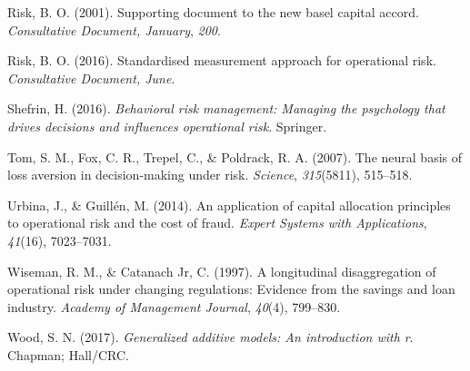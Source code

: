 \documentclass{DissertateUSU}
\begin{document}
\leavevmode\hypertarget{ref-risk2001supporting}{}%
Risk, B. O. (2001). Supporting document to the new basel capital accord.
\emph{Consultative Document, January}, \emph{200}.

\leavevmode\hypertarget{ref-risk2016supporting}{}%
Risk, B. O. (2016). Standardised measurement approach for operational
risk. \emph{Consultative Document, June}.

\leavevmode\hypertarget{ref-shefrin2016behavioral}{}%
Shefrin, H. (2016). \emph{Behavioral risk management: Managing the
psychology that drives decisions and influences operational risk}.
Springer.

\leavevmode\hypertarget{ref-tom2007neural}{}%
Tom, S. M., Fox, C. R., Trepel, C., \& Poldrack, R. A. (2007). The
neural basis of loss aversion in decision-making under risk.
\emph{Science}, \emph{315}(5811), 515--518.

\leavevmode\hypertarget{ref-urbina2014application}{}%
Urbina, J., \& Guillén, M. (2014). An application of capital allocation
principles to operational risk and the cost of fraud. \emph{Expert
Systems with Applications}, \emph{41}(16), 7023--7031.

\leavevmode\hypertarget{ref-wiseman1997longitudinal}{}%
Wiseman, R. M., \& Catanach Jr, C. (1997). A longitudinal disaggregation
of operational risk under changing regulations: Evidence from the
savings and loan industry. \emph{Academy of Management Journal},
\emph{40}(4), 799--830.

\leavevmode\hypertarget{ref-wood2017generalized}{}%
Wood, S. N. (2017). \emph{Generalized additive models: An introduction
with r}. Chapman; Hall/CRC.


\end{document}
